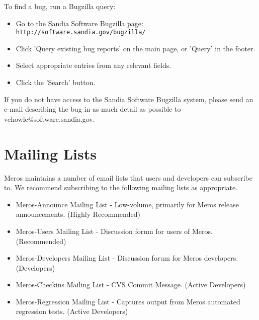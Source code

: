 To find a bug, run a Bugzilla query: 
\begin{itemize}
\item Go to the Sandia Software Bugzilla page:
  {\tt http://software.sandia.gov/bugzilla/}
\item Click 'Query existing bug reports' on the main page, or 'Query'
  in the footer. 
\item Select appropriate entries from any relevant fields.
\item Click the 'Search' button.
\end{itemize}


If you do not have access to the Sandia Software Bugzilla system,
please send an e-mail describing the bug in as much detail as possible 
to vehowle@software.sandia.gov.  

\section{Mailing Lists}
Meros maintains a number of email lists that users and developers can
subscribe to. We recommend subscribing to the following mailing lists
as appropriate. 

\begin{itemize}
\item Meros-Announce Mailing List - Low-volume, primarily for Meros
  release announcements. (Highly Recommended) 
\item Meros-Users Mailing List - Discussion forum for users of
  Meros. (Recommended) 
\item Meros-Developers Mailing List - Discussion forum for Meros
  developers. (Developers) 
\item Meros-Checkins Mailing List - CVS Commit Message. (Active
  Developers) 
\item Meros-Regression Mailing List - Captures output from Meros
  automated regression tests. (Active Developers) 
\end{itemize}




